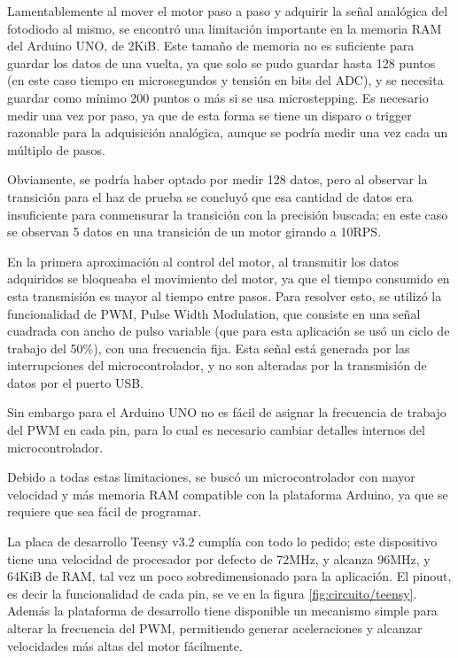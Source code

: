 Lamentablemente al mover el motor paso a paso y adquirir la señal analógica del fotodiodo al mismo, se encontró una limitación importante en la memoria RAM del Arduino UNO, de 2KiB. Este tamaño de memoria no es suficiente para guardar los datos de una vuelta, ya que solo se pudo guardar hasta 128 puntos (en este caso tiempo en microsegundos y tensión en bits del ADC), y se necesita guardar como mínimo 200 puntos o más si se usa microstepping. Es necesario medir una vez por paso, ya que de esta forma se tiene un disparo o trigger razonable para la adquisición analógica, aunque se podría medir una vez cada un múltiplo de pasos. 

Obviamente, se podría haber optado por medir 128 datos, pero al observar la transición para el haz de prueba se concluyó que esa cantidad de datos era insuficiente para conmensurar la transición con la precisión buscada; en este caso se observan 5 datos en una transición de un motor girando a 10RPS.

En la primera aproximación al control del motor, al transmitir los datos adquiridos se bloqueaba el movimiento del motor, ya que el tiempo consumido en esta transmisión es mayor al tiempo entre pasos. Para resolver esto, se utilizó la funcionalidad de PWM, Pulse Width Modulation, que consiste en una señal cuadrada con ancho de pulso variable (que para esta aplicación se usó un ciclo de trabajo del 50\%), con una frecuencia fija. Esta señal está generada por las interrupciones del microcontrolador, y no son alteradas por la transmisión de datos por el puerto USB.

Sin embargo para el Arduino UNO no es fácil de asignar la frecuencia de trabajo del PWM en cada pin, para lo cual es necesario cambiar detalles internos del microcontrolador.

Debido a todas estas limitaciones, se buscó un microcontrolador con mayor velocidad y más memoria RAM compatible con la plataforma Arduino, ya que se requiere que sea fácil de programar.

La placa de desarrollo Teensy v3.2\cite{teensy} cumplía con todo lo pedido; este dispositivo tiene una velocidad de procesador por defecto de 72MHz, y alcanza 96MHz, y 64KiB de RAM, tal vez un poco sobredimensionado para la aplicación. El pinout, es decir la funcionalidad de cada pin, se ve en la figura \ref{fig:circuito/teensy}. Además la plataforma de desarrollo tiene disponible un mecanismo simple para alterar la frecuencia del PWM, permitiendo generar aceleraciones y alcanzar velocidades más altas del motor fácilmente.

